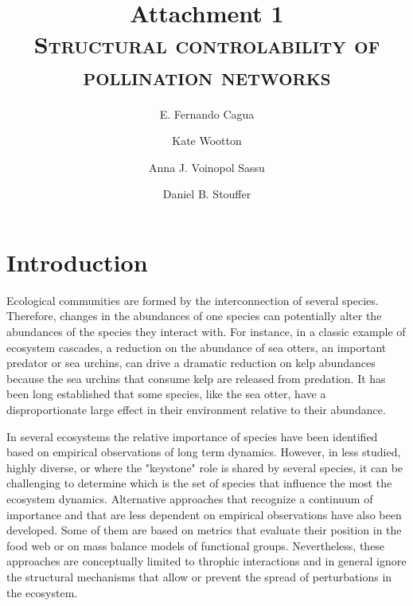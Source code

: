 \documentclass[a4paper,10pt]{article}
\begin{document}
  \title{{\normalsize Attachment 1} \\
	{\LARGE \textsc{Structural controlability of pollination networks}}}

  \author{\large E. Fernando Cagua}
  \author{\large Kate Wootton}
  \author{\large Anna J. Voinopol Sassu}
  \author{\large Daniel B. Stouffer}
 
\date{}
\maketitle

\linenumbers
\setlength\linenumbersep{15pt}
\renewcommand\linenumberfont{\normalfont\footnotesize\sffamily\color{gray}}

\doublespacing
 
\section*{Introduction}

Ecological communities are formed by the interconnection of several species. Therefore, changes in the abundances of one species can potentially alter the abundances of the species they interact with. For instance, in a classic example of ecosystem cascades, a reduction on the abundance of sea otters, an important predator or sea urchins, can drive a dramatic reduction on kelp abundances because the sea urchins that consume kelp are released from predation. It has been long established that some species, like the sea otter, have a disproportionate large effect in their environment relative to their abundance. 

In several ecosystems the relative importance of species have been identified based on empirical observations of long term dynamics. However, in less studied, highly diverse, or where the "keystone" role is shared by several species, it can be challenging to determine which is the set of species that influence the most the ecosystem dynamics. Alternative approaches that recognize a continuum of importance and that are less dependent on empirical observations have also been developed. Some of them are based on metrics that evaluate their position in the food web or on mass balance models of functional groups. Nevertheless, these approaches are conceptually limited to throphic interactions and in general ignore the structural mechanisms that allow or prevent the spread of perturbations in the ecosystem.
\end{document}
